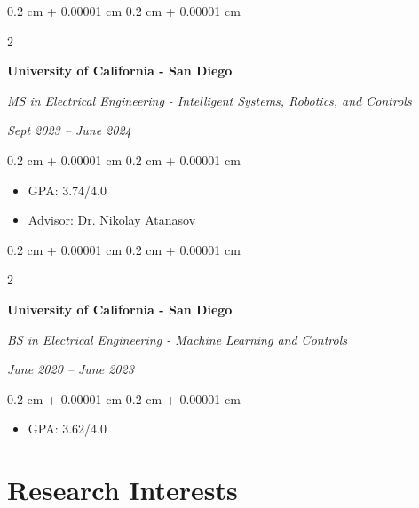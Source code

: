 \documentclass[10pt, letterpaper]{article}
\newenvironment{highlights}{
    \begin{itemize}[
        topsep=0.10 cm,
        parsep=0.10 cm,
        partopsep=0pt,
        itemsep=0pt,
        leftmargin=0.4 cm + 10pt
    ]
}{
    \end{itemize}
} %
\newenvironment{onecolentry}{
    \begin{adjustwidth}{
        0.2 cm + 0.00001 cm
    }{
        0.2 cm + 0.00001 cm
    }
}{
    \end{adjustwidth}
} %
\newenvironment{twocolentry}[2][]{
    \needspace{5\baselineskip}%
    \onecolentry
    \def\secondColumn{#2}
    \setcolumnwidth{\fill, 4.5 cm}
    \begin{paracol}{2}
}{
    \switchcolumn \raggedleft \secondColumn
    \end{paracol}
    \endonecolentry
} %
\begin{document}
        \vspace{0.2 cm}

        \begin{twocolentry}{
            
            
        \textit{Sept 2023 – June 2024}}
            \textbf{University of California - San Diego}

            \textit{MS in Electrical Engineering - Intelligent Systems, Robotics, and Controls}
        \end{twocolentry}

        \vspace{0.10 cm}
        \begin{onecolentry}
            \begin{highlights}
                \item GPA: 3.74/4.0 
                \item Advisor: Dr. Nikolay Atanasov
            \end{highlights}
        \end{onecolentry}
        
        \vspace{0.2 cm}
        
        \begin{twocolentry}{
            
            
        \textit{June 2020 – June 2023}}
            \textbf{University of California - San Diego}

            \textit{BS in Electrical Engineering - Machine Learning and Controls}
        \end{twocolentry}

        \vspace{0.10 cm}
        \begin{onecolentry}
            \begin{highlights}
                \item GPA: 3.62/4.0 
            \end{highlights}
        \end{onecolentry}

    \section{Research Interests}
\end{document}
